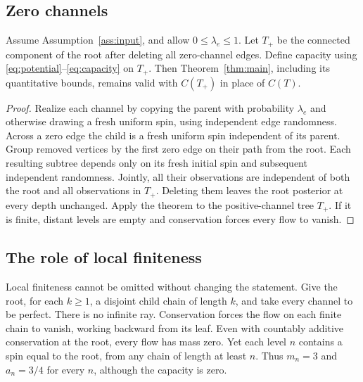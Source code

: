 \subsection{Zero channels}
\begin{corollary}\label{cor:zero}
Assume Assumption~\ref{ass:input}, and allow
$0\leq\lambda_e\leq1$. Let $T_+$ be the connected component of
the root after deleting all zero-channel edges. Define capacity using
\eqref{eq:potential}--\eqref{eq:capacity} on $T_+$. Then
Theorem~\ref{thm:main}, including its quantitative bounds, remains valid
with $C(T_+)$ in place of $C(T)$.
\end{corollary}
\begin{proof}
Realize each channel by copying the parent with probability
$\lambda_e$ and otherwise drawing a fresh uniform spin, using
independent edge randomness. Across a zero edge the child is a fresh
uniform spin independent of its parent. Group removed vertices by the
first zero edge on their path from the root. Each resulting subtree
depends only on its fresh initial spin and subsequent independent
randomness. Jointly, all their observations are independent of both
the root and all observations in $T_+$. Deleting them leaves the
root posterior at every depth unchanged. Apply the theorem to the
positive-channel tree $T_+$. If it is finite, distant levels are empty
and conservation forces every flow to vanish.
\end{proof}

\subsection{The role of local finiteness}
Local finiteness cannot be omitted without changing the statement.
Give the root, for each $k\geq1$, a disjoint child chain of length $k$,
and take every channel to be perfect. There is no infinite ray.
Conservation forces the flow on each finite chain to vanish, working
backward from its leaf. Even with countably additive conservation at
the root, every flow has mass zero. Yet each level $n$ contains a spin
equal to the root, from any chain of length at least $n$. Thus
$m_n=3$ and $a_n=3/4$ for every $n$, although the capacity is zero.
